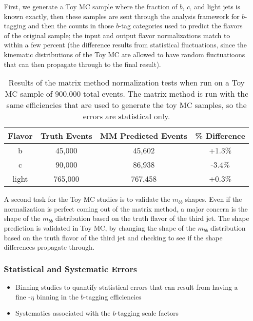 First, we generate a Toy MC sample where the fraction of $b$, $c$, and light 
jets is known exactly, then these samples are sent through the analysis framework for $b$-tagging and 
then the counts in those $b$-tag categories used to predict the flavors of the original sample; 
the input and output flavor normalizations match to within a few percent (the difference results from statistical fluctuations, 
since the kinematic distributions of the Toy MC are allowed to have random fluctuatioons that can then propagate through to the final result).  
\begin{table}
\centering
\caption{Results of the matrix method normalization tests when run on a Toy MC sample of 
    900,000 total events.  The matrix method is run with the same efficiencies that
    are used to generate the toy MC samples, so the errors are statistical only.
    \label{tab:mm_toy_mc}   }
  \begin{tabular}{cccc}
     \hline \hline
     Flavor & Truth Events & MM Predicted Events & \% Difference  \\ \hline
     b   & 45,000 & 45,602 & +1.3\% \\
     c   & 90,000 & 86,938 & -3.4\% \\
     light & 765,000 & 767,458 & +0.3\% \\
     \hline     \end{tabular}
\end{table}

A second task for the Toy MC studies is to validate the $m_{bb}$ shapes.  Even if the normalization is perfect coming out of the matrix method, a major concern is the shape of the $m_{bb}$ distribution based on the truth flavor of the third jet.  The shape prediction is validated in Toy MC, by changing the shape of the $m_{bb}$ distribution based on the truth flavor of the third jet and checking to see if the shape differences propagate through.  



\subsubsection{Statistical and Systematic Errors}
\begin{itemize}
    \item Binning studies to quantify statistical errors that can result from having a fine \pt-$\eta$ binning in the $b$-tagging efficiencies
    \item Systematics associated with the $b$-tagging scale factors
\end{itemize}




